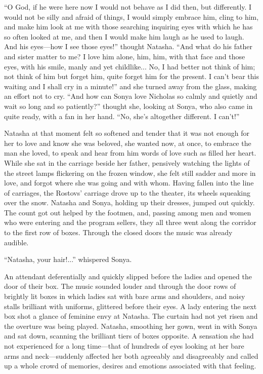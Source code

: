 ``O God, if he were here now I would not behave as I did then,
but differently. I would not be silly and afraid of things, I
would simply embrace him, cling to him, and make him look at me
with those searching inquiring eyes with which he has so often
looked at me, and then I would make him laugh as he used to
laugh. And his eyes---how I see those eyes!''  thought
Natasha. ``And what do his father and sister matter to me? I love
him alone, him, him, with that face and those eyes, with his
smile, manly and yet childlike... No, I had better not think of
him; not think of him but forget him, quite forget him for the
present. I can't bear this waiting and I shall cry in a minute!''
and she turned away from the glass, making an effort not to
cry. ``And how can Sonya love Nicholas so calmly and quietly and
wait so long and so patiently?'' thought she, looking at Sonya,
who also came in quite ready, with a fan in her hand.  ``No,
she's altogether different. I can't!''

Natasha at that moment felt so softened and tender that it was
not enough for her to love and know she was beloved, she wanted
now, at once, to embrace the man she loved, to speak and hear
from him words of love such as filled her heart. While she sat in
the carriage beside her father, pensively watching the lights of
the street lamps flickering on the frozen window, she felt still
sadder and more in love, and forgot where she was going and with
whom. Having fallen into the line of carriages, the Rostovs'
carriage drove up to the theater, its wheels squeaking over the
snow. Natasha and Sonya, holding up their dresses, jumped out
quickly. The count got out helped by the footmen, and, passing
among men and women who were entering and the program sellers,
they all three went along the corridor to the first row of boxes.
Through the closed doors the music was already audible.

``Natasha, your hair!...'' whispered Sonya.

An attendant deferentially and quickly slipped before the ladies
and opened the door of their box. The music sounded louder and
through the door rows of brightly lit boxes in which ladies sat
with bare arms and shoulders, and noisy stalls brilliant with
uniforms, glittered before their eyes. A lady entering the next
box shot a glance of feminine envy at Natasha. The curtain had
not yet risen and the overture was being played. Natasha,
smoothing her gown, went in with Sonya and sat down, scanning the
brilliant tiers of boxes opposite. A sensation she had not
experienced for a long time---that of hundreds of eyes looking at
her bare arms and neck---suddenly affected her both agreeably and
disagreeably and called up a whole crowd of memories, desires and
emotions associated with that feeling.

